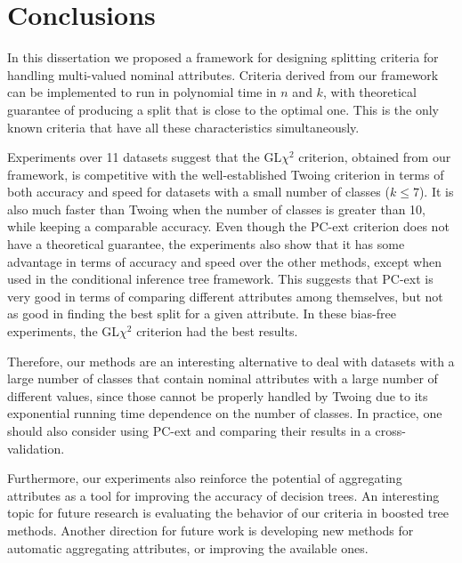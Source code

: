 \newpage

\chapter{Conclusions}
\label{chap:conclusions}

In this dissertation we proposed a framework for designing splitting criteria for handling multi-valued nominal attributes. Criteria derived from our framework can be implemented to run in polynomial time in $n$ and $k$, with theoretical guarantee of producing a split that is close to the optimal one. This is the only known criteria that have all these characteristics simultaneously.

Experiments over 11 datasets suggest that the GL$\chi^2$ criterion, obtained from our framework, is competitive with the well-established Twoing criterion in terms of both accuracy and speed for datasets with a small number of classes ($k \leq 7$). It is also much faster than Twoing when the number of classes is greater than 10, while keeping a comparable accuracy. Even though the PC-ext criterion does not have a theoretical guarantee, the experiments also show that it has some advantage in terms of accuracy and speed over the other methods, except when used in the conditional inference tree framework. This suggests that PC-ext is very good in terms of comparing different attributes among themselves, but not as good in finding the best split for a given attribute. In these bias-free experiments, the GL$\chi^2$ criterion had the best results.
 
Therefore, our methods are an interesting alternative to deal with datasets with a large number of classes that contain nominal attributes with a large number of different values, since those cannot be properly handled by Twoing due to its exponential running time dependence on the number of classes. In practice, one should also consider using PC-ext and comparing their results in a cross-validation.

Furthermore, our experiments also reinforce the potential of  aggregating attributes as a tool for improving the accuracy of decision trees. An interesting topic for  future research is evaluating the behavior of our criteria in boosted tree methods.
Another direction for future work is developing new methods for automatic aggregating attributes, or improving the available ones.
